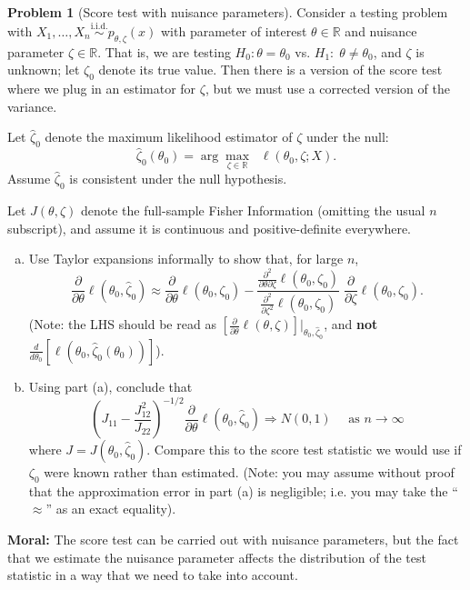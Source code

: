 \documentclass{article}
\newcommand{\RR}{\mathbb{R}}
\newcommand{\simiid}{\overset{\text{i.i.d.}}{\sim}}
\theoremstyle{definition}
\newtheorem{problem}{Problem}
\begin{document}
\begin{problem}[Score test with nuisance parameters]
Consider a testing problem with $X_1,\ldots,X_n \simiid p_{\theta,\zeta}(x)$ with parameter of interest $\theta \in \RR$ and nuisance parameter $\zeta\in \RR$. That is, we are testing $H_0:\theta = \theta_0$ vs. $H_1:\; \theta \neq \theta_0$, and $\zeta$ is unknown; let $\zeta_0$ denote its true value. Then there is a version of the score test where we plug in an estimator for $\zeta$, but we must use a corrected version of the variance.

Let $\hat\zeta_0$ denote the maximum likelihood estimator of $\zeta$ under the null:
\[
\hat\zeta_0(\theta_0) = \arg\max_{\zeta\in\RR} \;\;\ell(\theta_0,\zeta; X).
\]
Assume $\hat\zeta_0$ is consistent under the null hypothesis.

Let $J(\theta,\zeta)$ denote the full-sample Fisher Information (omitting the usual $n$ subscript), and assume it is continuous and positive-definite everywhere.

\begin{enumerate}[(a)]
\item Use Taylor expansions informally to show that, for large $n$,
\[
\frac{\partial}{\partial\theta} \ell(\theta_0,\hat\zeta_0)
\approx \frac{\partial}{\partial\theta}\ell(\theta_0,\zeta_0)
- \frac{\frac{\partial^2}{\partial\theta\partial\zeta} \ell(\theta_0,\zeta_0)}
{\frac{\partial^2}{\partial\zeta^2} \ell(\theta_0,\zeta_0)} \;\frac{\partial}{\partial\zeta} \ell(\theta_0,\zeta_0).
\]
(Note: the LHS should be read as $[\frac{\partial}{\partial\theta} \ell(\theta,\zeta)]\big|_{\theta_0,\hat\zeta_0}$, and {\bf not} $\frac{d}{d\theta_0} [\ell(\theta_0,\hat\zeta_0(\theta_0))]$).




\item Using part (a), conclude that
\[
\left(J_{11} - \frac{J_{12}^2}{J_{22}}\right)^{-1/2}
\frac{\partial}{\partial\theta} \ell(\theta_0,\hat\zeta_0) \Rightarrow N(0,1) \quad \text{ as } n \to\infty
\]
where $J = J(\theta_0,\hat\zeta_0)$. Compare this to the score test statistic we would use if $\zeta_0$ were known rather than estimated. (Note: you may assume without proof that the approximation error in part (a) is negligible; i.e. you may take the ``$\approx$'' as an exact equality).



\end{enumerate}

{\bf Moral:} The score test can be carried out with nuisance parameters, but the fact that we estimate the nuisance parameter affects the distribution of the test statistic in a way that we need to take into account.
\end{problem}
\end{document}
